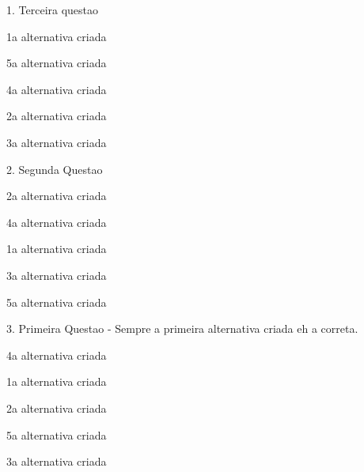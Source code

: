 \documentclass[11pt,brazil,a4paper]{exam}
\begin{document}
 \hspace{0mm} 1. Terceira questao\vspace{0mm}

\begin{oneparchoices}

\choice 1a alternativa criada

\choice 5a alternativa criada

\choice 4a alternativa criada

\choice 2a alternativa criada

\choice 3a alternativa criada
\end{oneparchoices}\vspace{1mm}



 \hspace{0mm} 2. Segunda Questao\vspace{0mm}

\begin{oneparchoices}

\choice 2a alternativa criada

\choice 4a alternativa criada

\choice 1a alternativa criada

\choice 3a alternativa criada

\choice 5a alternativa criada
\end{oneparchoices}\vspace{1mm}



 \hspace{0mm} 3. Primeira Questao - Sempre a primeira alternativa criada eh a correta.\vspace{0mm}

\begin{oneparchoices}

\choice 4a alternativa criada

\choice 1a alternativa criada

\choice 2a alternativa criada

\choice 5a alternativa criada

\choice 3a alternativa criada
\end{oneparchoices}\vspace{1mm}


 \ \ \ 
 \newpage
\end{document}
